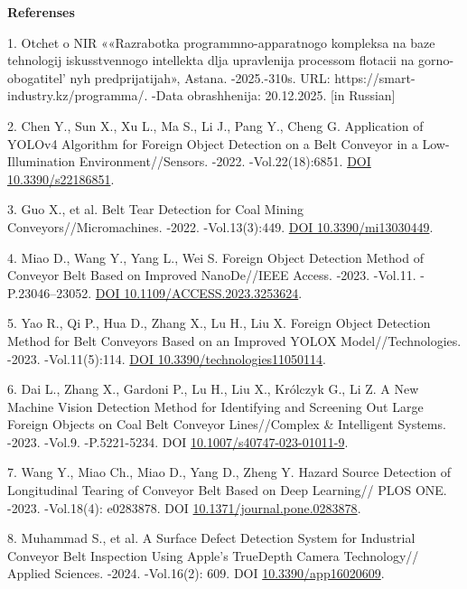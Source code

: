 \begin{center}
{\bfseries Referenses}
\end{center}

\begin{refs}
1. Otchet o NIR ««Razrabotka programmno-apparatnogo kompleksa na baze
tehnologij iskusstvennogo intellekta dlja upravlenija processom flotacii
na gorno-obogatitel' nyh predprijatijah», Astana.
-2025.-310s. URL: https://smart-industry.kz/programma/. -Data
obrashhenija: 20.12.2025. {[}in Russian{]}

2. Chen Y., Sun X., Xu L., Ma S., Li J., Pang Y., Cheng G. Application
of YOLOv4 Algorithm for Foreign Object Detection on a Belt Conveyor in a
Low-Illumination Environment//Sensors. -2022. -Vol.22(18):6851.
\href{https://doi.org/10.3390/s22186851}{DOI 10.3390/s22186851}.

3. Guo X., et al. Belt Tear Detection for Coal Mining
Conveyors//Micromachines. -2022. -Vol.13(3):449.
\href{https://doi.org/10.3390/mi13030449}{DOI 10.3390/mi13030449}.

4. Miao D., Wang Y., Yang L., Wei S. Foreign Object Detection Method of
Conveyor Belt Based on Improved NanoDe//IEEE Access. -2023. -Vol.11.
-P.23046--23052. \href{https://doi.org/10.1109/ACCESS.2023.3253624}{DOI
10.1109/ACCESS.2023.3253624}.

5. Yao R., Qi P., Hua D., Zhang X., Lu H., Liu X. Foreign Object
Detection Method for Belt Conveyors Based on an Improved YOLOX
Model//Technologies. -2023. -Vol.11(5):114.
\href{https://doi.org/10.3390/technologies11050114}{DOI
10.3390/technologies11050114}.

6. Dai L., Zhang X., Gardoni P., Lu H., Liu X., Królczyk G., Li Z. A New
Machine Vision Detection Method for Identifying and Screening Out Large
Foreign Objects on Coal Belt Conveyor Lines//Complex \& Intelligent
Systems. -2023. -Vol.9. -P.5221-5234. DOI
\href{https://doi.org/10.1007/s40747-023-01011-9}{10.1007/s40747-023-01011-9}.

7. Wang Y., Miao Ch., Miao D., Yang D., Zheng Y. Hazard Source Detection
of Longitudinal Tearing of Conveyor Belt Based on Deep Learning// PLOS
ONE. -2023. -Vol.18(4): e0283878. DOI
\href{https://doi.org/10.1371/journal.pone.0283878}{10.1371/journal.pone.0283878}.

8. Muhammad S., et al. A Surface Defect Detection System for Industrial
Conveyor Belt Inspection Using Apple's TrueDepth Camera Technology//
Applied Sciences. -2024. -Vol.16(2): 609. DOI
\href{https://doi.org/10.3390/app16020609}{10.3390/app16020609}.


\end{refs}
